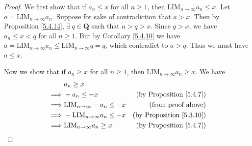\begin{proof}
    We first show that if \(a_n \leq x\) for all \(n \geq 1\), then \(\text{LIM}_{n \to \infty} a_n \leq x\).
    Let \(a = \text{LIM}_{n \to \infty} a_n\).
    Suppose for sake of contradiction that \(a > x\).
    Then by Proposition \ref{5.4.14}, \(\exists\ q \in \mathbf{Q}\) such that \(a > q > x\).
    Since \(q > x\), we have \(a_n \leq x < q\) for all \(n \geq 1\).
    But by Corollary \ref{5.4.10} we have \(a = \text{LIM}_{n \to \infty} a_n \leq \text{LIM}_{n \to \infty} q = q\), which contradict to \(a > q\).
    Thus we must have \(a \leq x\).

    Now we show that if \(a_n \geq x\) for all \(n \geq 1\), then \(\text{LIM}_{n \to \infty} a_n \geq x\).
    We have
    \begin{align*}
                 & a_n \geq x                                                                    \\
        \implies & -a_n \leq -x                           & \text{(by Proposition \ref{5.4.7})}  \\
        \implies & \text{LIM}_{n \to \infty} -a_n \leq -x & \text{(from proof above)}            \\
        \implies & -\text{LIM}_{n \to \infty} a_n \leq -x & \text{(by Proposition \ref{5.3.10})} \\
        \implies & \text{LIM}_{n \to \infty} a_n \geq x.  & \text{(by Proposition \ref{5.4.7})}
    \end{align*}
\end{proof}